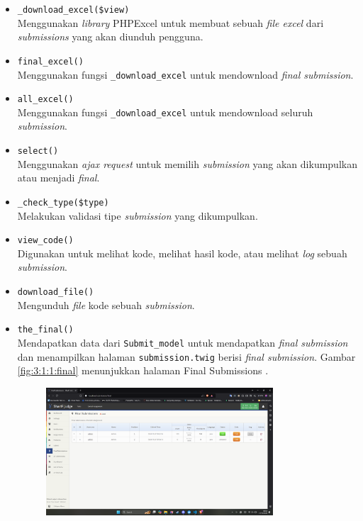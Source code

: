 \documentclass[a4paper,twoside]{article}
\begin{document}
\begin{enumerate}
\begin{itemize}
\begin{itemize}
			                  \begin{itemize}
				                  \item \verb|_download_excel($view)| \\
				                        Menggunakan \textit{library} PHPExcel untuk membuat sebuah \textit{file excel} dari \textit{submissions} yang akan diunduh pengguna.
				                  \item \verb|final_excel()| \\
				                        Menggunakan fungsi \verb|_download_excel| untuk mendownload \textit{final submission}.
				                  \item \verb|all_excel()| \\
				                        Menggunakan fungsi \verb|_download_excel| untuk mendownload seluruh \textit{submission}.
				                  \item \verb|select()| \\
				                        Menggunakan \textit{ajax request} untuk memilih \textit{submission} yang akan dikumpulkan atau menjadi \textit{final}.
				                  \item \verb|_check_type($type)| \\
				                        Melakukan validasi tipe \textit{submission} yang dikumpulkan.
				                  \item \verb|view_code()| \\
				                        Digunakan untuk melihat kode, melihat hasil kode, atau melihat \textit{log} sebuah \textit{submission}.
				                  \item \verb|download_file()| \\
				                        Mengunduh \textit{file} kode sebuah \textit{submission}.
				                  \item \verb|the_final()| \\
				                        Mendapatkan data dari \verb|Submit_model| untuk mendapatkan \textit{final submission} dan menampilkan halaman \verb|submission.twig| berisi \textit{final submission}. Gambar \ref{fig:3:1:1:final} menunjukkan halaman Final Submissions .
				                        \begin{figure}[H]
					                        \centering
					                        \includegraphics[width=0.8\textwidth]{views/final_submissions.png}

\end{figure}
\end{itemize}
\end{itemize}
\end{itemize}
\end{enumerate}
\end{document}
